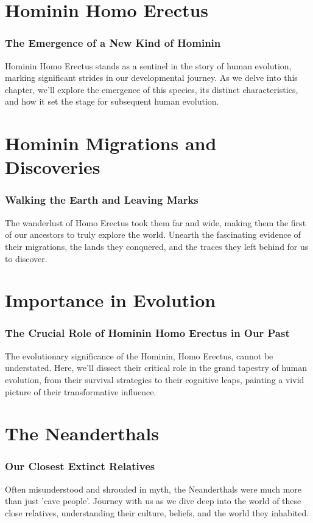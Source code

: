 \documentclass[a4paper,12pt]{book}
\begin{document}
\chapter{Hominin Homo Erectus}
\subsection*{The Emergence of a New Kind of Hominin}
Hominin Homo Erectus stands as a sentinel in the story of human evolution, marking significant strides in our developmental journey. As we delve into this chapter, we'll explore the emergence of this species, its distinct characteristics, and how it set the stage for subsequent human evolution.

\chapter{Hominin Migrations and Discoveries}
\subsection*{Walking the Earth and Leaving Marks}
The wanderlust of Homo Erectus took them far and wide, making them the first of our ancestors to truly explore the world. Unearth the fascinating evidence of their migrations, the lands they conquered, and the traces they left behind for us to discover.

\chapter{Importance in Evolution}
\subsection*{The Crucial Role of Hominin Homo Erectus in Our Past}
The evolutionary significance of the Hominin, Homo Erectus, cannot be understated. Here, we'll dissect their critical role in the grand tapestry of human evolution, from their survival strategies to their cognitive leaps, painting a vivid picture of their transformative influence.

\chapter{The Neanderthals}
\subsection*{Our Closest Extinct Relatives}
Often misunderstood and shrouded in myth, the Neanderthals were much more than just 'cave people'. Journey with us as we dive deep into the world of these close relatives, understanding their culture, beliefs, and the world they inhabited.
\end{document}
